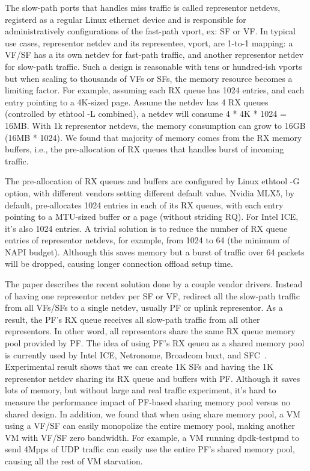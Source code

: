 \documentclass[letterpaper]{article}
\begin{document}
The slow-path ports that handles miss traffic is called representor
netdevs, registerd as a regular Linux ethernet device and is responsible
for administratively configurations of the fast-path vport, ex: SF or VF.
In typical use cases, representor netdev and its representee, vport,
are 1-to-1 mapping: a VF/SF has a its own netdev for fast-path traffic,
and another representor netdev for slow-path traffic.
Such a design is reasonable with tens or hundred-ish vports but when scaling
to thousands of VFs or SFs, the memory resource becomes a limiting factor.
For example, assuming each RX queue has 1024 entries, and each entry
pointing to a 4K-sized page. Assume the netdev has 4 RX queues (controlled
by ethtool -L combined), a netdev will consume 4 * 4K * 1024 = 16MB.
With 1k representor netdevs, the memory consumption can grow
to 16GB (16MB * 1024). We found that majority of memory comes from
the RX memory buffers, i.e., the pre-allocation of RX queues that handles
burst of incoming traffic.

The pre-allocation of RX queues and buffers are configured by Linux
ethtool -G option, with different vendors setting different default
value. Nvidia MLX5, by default, pre-allocates 1024 entries in each of
its RX queues, with each entry pointing to a MTU-sized buffer or a page
(without striding RQ). For Intel ICE, it's also 1024 entries. %
A trivial solution is to reduce the number of RX queue entries of
representor netdevs, for example, from 1024 to 64 (the minimum of NAPI
budget). Although this saves memory but a burst of traffic over 64 packets
will be dropped, causing longer connection offload setup time.

The paper describes the recent solution done by a couple vendor drivers.
Instead of having one representor netdev per SF or VF, redirect all
the slow-path traffic from all VFs/SFs to a single netdev, usually PF or
uplink representor. As a result, the PF's RX queue receives all slow-path
traffic from all other representors. In other word, all representors
share the same RX queue memory pool provided by PF. The idea of using PF's
RX qeueu as a shared memory pool is currently used by Intel ICE, Netronome,
Broadcom bnxt, and SFC~\cite{duedeli}.
Experimental result shows that we can create 1K SFs and having the 1K
representor netdev sharing its RX queue and buffers with PF. Although
it saves lots of memory, but without large and real traffic experiment,
it's hard to measure the performance impact of PF-based sharing memory
pool versus no shared design. In addition, we found that when using share
memory pool, a VM using a VF/SF can easily monopolize the entire memory
pool, making another VM with VF/SF zero bandwidth. For example, a VM
running dpdk-testpmd to send 4Mpps of UDP traffic can easily use the
entire PF's shared memory pool, causing all the rest of VM starvation.
\end{document}
